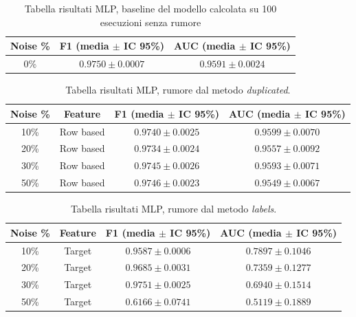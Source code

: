 \documentclass[../main.tex]{subfiles}
\begin{document}
\begin{table}[H]
\centering\small
{}
\begin{tabular}{ccc}
\toprule
\textbf{Noise \%} & \textbf{F1 (media $\pm$ IC 95\%)} & \textbf{AUC (media $\pm$ IC 95\%)} \\
\midrule
0\%  & $ 0.9750 \pm 0.0007$ & $0.9591 \pm 0.0024$ \\
\bottomrule
\end{tabular}
\caption{Tabella risultati MLP, baseline del modello calcolata su 100 esecuzioni senza rumore}
\label{tab:mlp_baseline}
\end{table}
\begin{table}[H]
\centering\small
{}
\begin{tabular}{cccc}
\toprule
\textbf{Noise \%} & \textbf{Feature} & \textbf{F1 (media $\pm$ IC 95\%)} & \textbf{AUC (media $\pm$ IC 95\%)} \\
\midrule
10\% & Row based & $0.9740 \pm 0.0025$ & $0.9599 \pm 0.0070$ \\
20\% & Row based & $0.9734 \pm 0.0024$ & $0.9557 \pm 0.0092$ \\
30\% & Row based & $0.9745 \pm 0.0026$ & $0.9593 \pm 0.0071$ \\
50\% & Row based & $0.9746 \pm 0.0023$ & $0.9549 \pm 0.0067$ \\
\bottomrule
\end{tabular}
\caption{Tabella risultati MLP, rumore dal metodo \textit{duplicated}.}
\label{tab:mlp_duplicated}
\end{table}
\begin{table}[H]
\centering\small
{}
\begin{tabular}{cccc}
\toprule
\textbf{Noise \%} & \textbf{Feature} & \textbf{F1 (media $\pm$ IC 95\%)} & \textbf{AUC (media $\pm$ IC 95\%)} \\
\midrule
10\% & Target & $0.9587 \pm 0.0006$ & $0.7897 \pm 0.1046$ \\
20\% & Target & $0.9685 \pm 0.0031$ & $0.7359 \pm 0.1277$ \\
30\% & Target & $0.9751 \pm 0.0025$ & $0.6940 \pm 0.1514$ \\
50\% & Target & $\mathbf{0.6166 \pm 0.0741}$ & $\mathbf{0.5119 \pm 0.1889}$ \\
\bottomrule
\end{tabular}
\caption{Tabella risultati MLP, rumore dal metodo \textit{labels}.}
\label{tab:mlp_labels}
\end{table}
\end{document}
